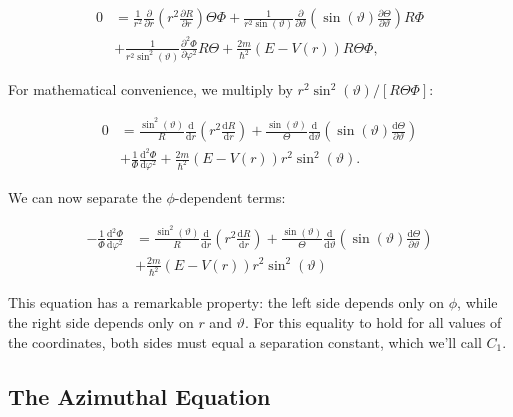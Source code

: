 \documentclass[
  a4paper,
]{book}
\begin{document}
\[
\begin{aligned}
0 & =
\frac{1}{r^2} \frac{\partial}{\partial r} \left( r^2 \frac{\partial R}{\partial r} \right) \Theta \Phi
+ \frac{1}{r^2 \sin \left( \vartheta \right)} \frac{\partial}{\partial \vartheta}
\left( \sin \left( \vartheta \right) \frac{\partial \Theta}{\partial \vartheta} \right) R \Phi \\
&  + \frac{1}{r^2 \sin^2 \left( \vartheta \right)} \frac{\partial^2 \Phi}{\partial \varphi^2} R \Theta
+ \frac{2m}{\hbar^2} \left( E - V\left( r \right) \right) R \Theta \Phi \mathrm{,}
\end{aligned}
\]

For mathematical convenience, we multiply by
\(r^2 \sin^2 \left( \vartheta \right) / \left[ R \Theta \Phi \right]\):

\[
\begin{aligned}
0 & =
\frac{\sin^2\left( \vartheta \right)}{R} \frac{\mathrm{d}}{\mathrm{d} r}
\left( r^2 \frac{\mathrm{d} R}{\mathrm{d} r} \right)
+ \frac{\sin \left( \vartheta \right)}{\Theta} \frac{\mathrm{d}}{\mathrm{d} \vartheta}
\left( \sin \left( \vartheta \right) \frac{\mathrm{d} \Theta}{\partial \vartheta} \right) \\
&  + \frac{1}{\Phi} \frac{\mathrm{d}^2 \Phi}{\mathrm{d} \varphi^2}
+ \frac{2m}{\hbar^2} \left( E - V\left(r\right)\right)r^2\sin^2\left(\vartheta\right) \mathrm{.}
\end{aligned}
\]

We can now separate the \(\phi\)-dependent terms:

\[
\begin{aligned}
-\frac{1}{\Phi} \frac{\mathrm{d}^2 \Phi}{\mathrm{d} \varphi^2}
& =
\frac{\sin^2\left( \vartheta \right)}{R} \frac{\mathrm{d}}{\mathrm{d} r}
\left( r^2 \frac{\mathrm{d} R}{\mathrm{d} r} \right)
+ \frac{\sin \left( \vartheta \right)}{\Theta} \frac{\mathrm{d}}{\mathrm{d} \vartheta}
\left( \sin \left( \vartheta \right) \frac{\mathrm{d} \Theta}{\partial \vartheta} \right) \\
&  + \frac{2m}{\hbar^2} \left( E - V\left( r \right) \right) r^2 \sin^2 \left( \vartheta \right)
\end{aligned}
\]

This equation has a remarkable property: the left side depends only on
\(\phi\), while the right side depends only on \(r\) and \(\vartheta\).
For this equality to hold for all values of the coordinates, both sides
must equal a separation constant, which we'll call \(C_1\).

\subsection{The Azimuthal Equation}\label{the-azimuthal-equation}
\end{document}

